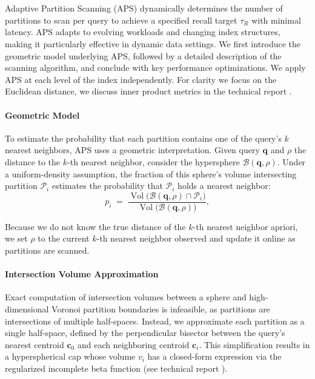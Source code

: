\section{}
\label{sec:adaptive_partition_scanning}

Adaptive Partition Scanning (APS) dynamically determines the number of partitions to scan per query to achieve a specified recall target $\tau_R$ with minimal latency. APS adapts to evolving workloads and changing index structures, making it particularly effective in dynamic data settings. We first introduce the geometric model underlying APS, followed by a detailed description of the scanning algorithm, and conclude with key performance optimizations. We apply APS at each level of the index independently. For clarity we focus on the Euclidean distance, we discuss inner product metrics in the technical report \cite{mohoney2025quakeadaptiveindexingvector}.

\paragraph{Geometric Model}
To estimate the probability that each partition contains one of the query’s $k$ nearest neighbors, APS uses a geometric interpretation. Given query $\mathbf{q}$ and $\rho$ the distance to the $k$-th nearest neighbor, consider the hypersphere $\mathcal{B}(\mathbf{q},\rho)$. Under a uniform-density assumption, the fraction of this sphere’s volume intersecting partition $\mathcal{P}_i$ estimates the probability that $\mathcal{P}_i$ holds a nearest neighbor:
\begin{equation}
p_i \;=\;
\frac{\operatorname{Vol}\!\bigl(\mathcal B(\mathbf q,\rho)\cap\mathcal P_i\bigr)}
     {\operatorname{Vol}\!\bigl(\mathcal B(\mathbf q,\rho)\bigr)},
\label{eq:aps-pi}
\end{equation}

Because we do not know the true distance of the $k$-th nearest neighbor apriori, we set $\rho$ to the current $k$-th nearest neighbor observed and update it online as partitions are scanned.

\paragraph{Intersection Volume Approximation}
Exact computation of intersection volumes between a sphere and high-dimensional Voronoi partition boundaries is infeasible, as partitions are intersections of multiple half-spaces. Instead, we approximate each partition as a single half-space, defined by the perpendicular bisector between the query’s nearest centroid $\mathbf{c}_0$ and each neighboring centroid $\mathbf{c}_i$. This simplification results in a hyperspherical cap whose volume $v_i$ has a closed-form expression via the regularized incomplete beta function \cite{li2010concise, lee2014concise} (see technical report \cite{mohoney2025quakeadaptiveindexingvector}).

